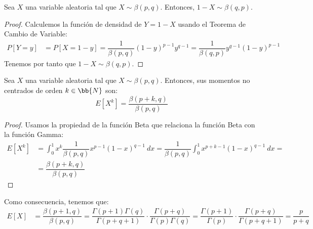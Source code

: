\begin{prop}[Simetría]
    Sea $X$ una variable aleatoria tal que $X\sim \beta(p,q)$. Entonces, $1-X\sim \beta(q,p)$.
\end{prop}
\begin{proof}
    Calculemos la función de densidad de $Y=1-X$ usando el Teorema de Cambio de Variable:
    \begin{align*}
        P[Y=y] &= P[X=1-y] = \dfrac{1}{\beta(p,q)}(1-y)^{p-1}y^{q-1}
        = \dfrac{1}{\beta(q,p)}y^{q-1}(1-y)^{p-1}
    \end{align*}
    Tenemos por tanto que $1-X\sim \beta(q,p)$.
\end{proof}


\begin{prop}
    Sea $X$ una variable aleatoria tal que $X\sim \beta(p,q)$. Entonces, sus momentos no centrados de orden $k\in \bb{N}$ son:
    \begin{equation*}
        E[X^k] = \dfrac{\beta(p+k,q)}{\beta(p,q)}
    \end{equation*}
\end{prop}
\begin{proof}
    Usamos la propiedad de la función Beta que relaciona la función Beta con la función Gamma:
    \begin{align*}
        E[X^k] &= \int_{0}^{1} x^k \dfrac{1}{\beta(p,q)}x^{p-1}(1-x)^{q-1}~dx
        = \dfrac{1}{\beta(p,q)} \int_{0}^{1} x^{p+k-1}(1-x)^{q-1}~dx
        =\\&= \dfrac{\beta(p+k,q)}{\beta(p,q)}
    \end{align*}
\end{proof}

Como consecuencia, tenemos que:
\begin{align*}
    E[X] &= \dfrac{\beta(p+1,q)}{\beta(p,q)}
    = \dfrac{\Gamma(p+1)\Gamma(q)}{\Gamma(p+q+1)} \cdot \dfrac{\Gamma(p+q)}{\Gamma(p)\Gamma(q)} = \dfrac{\Gamma(p+1)}{\Gamma(p)} \cdot \dfrac{\Gamma(p+q)}{\Gamma(p+q+1)} = \dfrac{p}{p+q}
\end{align*}

